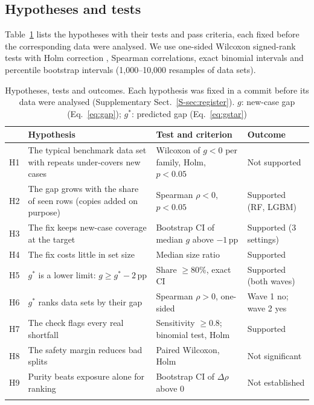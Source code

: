 \subsection{Hypotheses and tests}
Table~\ref{tab:hyp} lists the hypotheses with their tests and pass criteria, each fixed before the corresponding data were analysed. We use one-sided Wilcoxon signed-rank tests \citep{wilcoxon1945} with Holm correction \citep{holm1979}, Spearman correlations, exact binomial intervals and percentile bootstrap intervals (1,000--10,000 resamples of data sets).

\begin{table}[t]
\caption{Hypotheses, tests and outcomes. Each hypothesis was fixed in a commit before its data were analysed (Supplementary Sect.~\ref{S-sec:register}). $g$: new-case gap (Eq.~\ref{eq:gap}); $g^*$: predicted gap (Eq.~\ref{eq:gstar})}\label{tab:hyp}
\centering\footnotesize
\setlength{\tabcolsep}{3pt}
\begin{tabularx}{\textwidth}{@{}lXXp{2.3cm}@{}}
\toprule
 & Hypothesis & Test and criterion & Outcome\\
\midrule
H1 & The typical benchmark data set with repeats under-covers new cases & Wilcoxon of $g<0$ per family, Holm, $p<0.05$ & Not supported\\
H2 & The gap grows with the share of seen rows (copies added on purpose) & Spearman $\rho<0$, $p<0.05$ & Supported (RF, LGBM)\\
H3 & The fix keeps new-case coverage at the target & Bootstrap CI of median $g$ above $-1$\,pp & Supported (3 settings)\\
H4 & The fix costs little in set size & Median size ratio & Supported\\
H5 & $g^*$ is a lower limit: $g\ge g^*-2$\,pp & Share $\ge$80\%, exact CI & Supported (both waves)\\
H6 & $g^*$ ranks data sets by their gap & Spearman $\rho>0$, one-sided & Wave 1 no; wave 2 yes\\
H7 & The check flags every real shortfall & Sensitivity $\ge$0.8; binomial test, Holm & Supported\\
H8 & The safety margin reduces bad splits & Paired Wilcoxon, Holm & Not significant\\
H9 & Purity beats exposure alone for ranking & Bootstrap CI of $\Delta\rho$ above 0 & Not established\\
\botrule
\end{tabularx}
\end{table}
